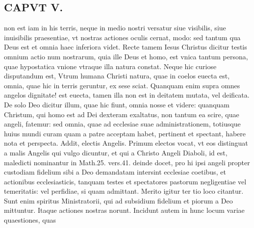 \documentclass{article}
\begin{document}
\begin{pages}
\section*{CAPVT  V. }
\marginpar{[ p.3 ]}\pstart non est iam in his terris, neque in medio nostri versatur siue visibilis, siue inuisibilis praesentiae, vt nostras actiones oculis cernat, modo: sed tantum qua Deus est et omnia haec inferiora videt. Recte tamem Iesus Christus dicitur testis omnium actio num nostrarum, quia ille Deus et homo, est vnica tantum persona, quae hypostatica vnione vtraque illa natura constat. Neque hic curiose disputandum est, Vtrum humana Christi natura, quae in coelos euecta est, omnia, quae hic in terris geruntur, ex sese sciat. Quanquam enim supra omnes angelos dignitate! est euecta, tamen illa non est in deitatem mutata, vel deificata. De solo Deo dicitur illum, quae hic fiunt, omnia nosse et videre: quanquam Christum, qui homo est ad Dei dexteram exaltatus, non tantum ea scire, quae angeli, fatemur: sed omnia, quae ad ecclesiae suae administrationem, totiusque huius mundi curam quam a patre acceptam habet, pertinent et spectant, habere nota et perspecta. Addit, electis Angelis. Primum electos vocat, vt eos distinguat a malis Angelis qui vulgo dicuntur, et qui a Christo Angeli Diaboli, id est, maledicti nominantur in Math.25. vers.41. deinde docet, pro hi ipsi angeli propter custodiam fidelium sibi a Deo demandatam intersint ecclesiae coetibus, et actionibus ecclesiasticis, tanquam testes et spectatores pastorum negligentiae vel temeritatis: vel perfidiae, si quam admittant. Merito igitur ter tio loco citantur. Sunt enim spiritus Ministratorii, qui ad subsidium fidelium et piorum a Deo mittuntur. Itaque actiones nostras norunt. Incidunt autem in hunc locum variae quaestiones, quas  \pend

\end{pages}
\end{document}
